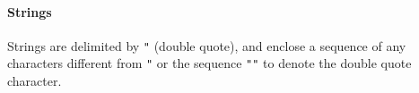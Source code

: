 \paragraph{Strings}
Strings are delimited by \verb!"! (double quote), and enclose a
sequence of any characters different from \verb!"! or the sequence
\verb!""! to denote the double quote character.


      


